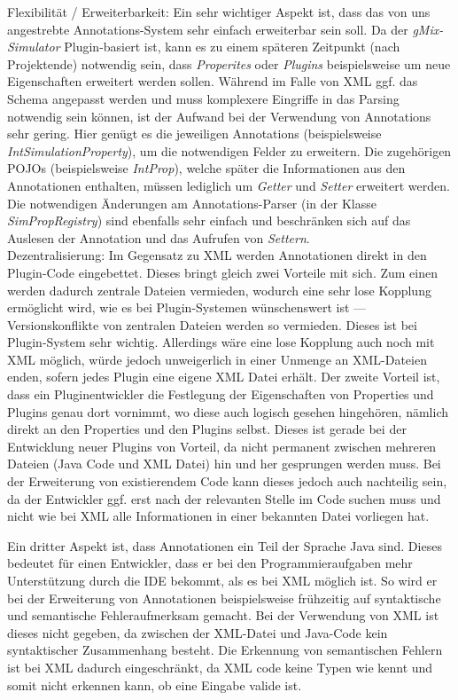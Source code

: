 \documentclass[a4paper, 11pt]{article} %
\begin{document}
Flexibilität / Erweiterbarkeit: Ein sehr wichtiger Aspekt ist, dass das von uns angestrebte Annotations-System sehr einfach erweiterbar sein soll. Da der \emph{gMix-Simulator} Plugin-basiert ist, kann es zu einem späteren Zeitpunkt (nach Projektende) notwendig sein, dass \emph{Properites} oder \emph{Plugins} beispielsweise um neue Eigenschaften erweitert werden sollen. Während im Falle von XML ggf. das Schema angepasst werden und muss komplexere Eingriffe in das Parsing notwendig sein können, ist der Aufwand bei der Verwendung von Annotations sehr gering. Hier genügt es die jeweiligen Annotations (beispielsweise \emph{IntSimulationProperty}), um die notwendigen Felder zu erweitern. Die zugehörigen POJOs (beispielsweise \emph{IntProp}), welche später die Informationen aus den Annotationen enthalten, müssen lediglich um \emph{Getter} und \emph{Setter} erweitert werden. Die notwendigen Änderungen am Annotations-Parser (in der Klasse \emph{SimPropRegistry}) sind ebenfalls sehr einfach und beschränken sich auf das Auslesen der Annotation und das Aufrufen von \emph{Settern}.\\

Dezentralisierung: Im Gegensatz zu XML werden Annotationen direkt in den Plugin-Code eingebettet. Dieses bringt gleich zwei Vorteile mit sich. Zum einen werden dadurch zentrale Dateien vermieden, wodurch eine sehr lose Kopplung ermöglicht wird, wie es bei Plugin-Systemen wünschenswert ist --- Versionskonflikte von zentralen Dateien werden so vermieden. Dieses ist bei Plugin-System sehr wichtig. Allerdings wäre eine lose Kopplung auch noch mit XML möglich, würde jedoch unweigerlich in einer Unmenge an XML-Dateien enden, sofern jedes Plugin eine eigene XML Datei erhält. Der zweite Vorteil ist, dass ein Pluginentwickler die Festlegung der Eigenschaften von Properties und Plugins genau dort vornimmt, wo diese auch logisch gesehen hingehören, nämlich direkt an den Properties und den Plugins selbst. Dieses ist gerade bei der Entwicklung neuer Plugins von Vorteil, da nicht permanent zwischen mehreren Dateien (Java Code und XML Datei) hin und her gesprungen werden muss. Bei der Erweiterung von existierendem Code kann dieses jedoch auch nachteilig sein, da der Entwickler ggf. erst nach der relevanten Stelle im Code suchen muss und nicht wie bei XML alle Informationen in einer bekannten Datei vorliegen hat.

\newpage
Ein dritter Aspekt ist, dass Annotationen ein Teil der Sprache Java sind. Dieses bedeutet für einen Entwickler, dass er bei den Programmieraufgaben mehr Unterstützung durch die IDE bekommt, als es bei XML möglich ist. So wird er bei der Erweiterung von Annotationen beispielsweise frühzeitig auf syntaktische und semantische Fehleraufmerksam gemacht. Bei der Verwendung von XML ist dieses nicht gegeben, da zwischen der XML-Datei und Java-Code kein syntaktischer Zusammenhang besteht. Die Erkennung von semantischen Fehlern ist bei XML dadurch eingeschränkt, da XML code keine Typen wie kennt und somit nicht erkennen kann, ob eine Eingabe valide ist.\\
\end{document}
